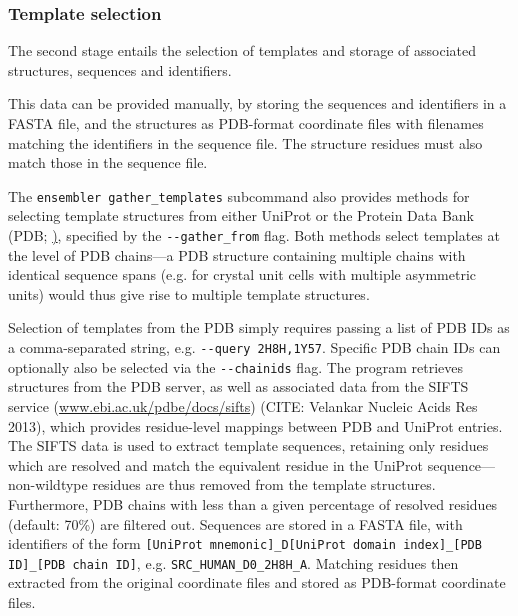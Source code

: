 \documentclass[aps,pre,twocolumn,nofootinbib,superscriptaddress,linenumbers]{revtex4-1}
\begin{document}
\subsubsection{Template selection}

The second stage entails the selection of templates and storage of associated structures, sequences and identifiers.

This data can be provided manually, by storing the sequences and identifiers in a FASTA file, and the structures as PDB-format coordinate files with filenames matching the identifiers in the sequence file.
The structure residues must also match those in the sequence file.

The {\tt ensembler gather\_templates} subcommand also provides methods for selecting template structures from either UniProt or the Protein Data Bank (PDB; \href{http://www.rcsb.org/pdb}), specified by the {\tt -{}-gather\_from} flag.
Both methods select templates at the level of PDB chains---a PDB structure containing multiple chains with identical sequence spans (e.g. for crystal unit cells with multiple asymmetric units) would thus give rise to multiple template structures.


Selection of templates from the PDB simply requires passing a list of PDB IDs as a comma-separated string, e.g. {\tt -{}-query 2H8H,1Y57}.
Specific PDB chain IDs can optionally also be selected via the {\tt -{}-chainids} flag.
The program retrieves structures from the PDB server, as well as associated data from the SIFTS service (\href{http://www.ebi.ac.uk/pdbe/docs/sifts/}{www.ebi.ac.uk/pdbe/docs/sifts}) (CITE: Velankar Nucleic Acids Res 2013), which provides residue-level mappings between PDB and UniProt entries.
The SIFTS data is used to extract template sequences, retaining only residues which are resolved and match the equivalent residue in the UniProt sequence---non-wildtype residues are thus removed from the template structures.
Furthermore, PDB chains with less than a given percentage of resolved residues (default: 70\%) are filtered out.
Sequences are stored in a FASTA file, with identifiers of the form {\tt [UniProt mnemonic]\_D[UniProt domain index]\_[PDB ID]\_[PDB chain ID]}, e.g. {\tt SRC\_HUMAN\_D0\_2H8H\_A}.
Matching residues then extracted from the original coordinate files and stored as PDB-format coordinate files.
\end{document}
